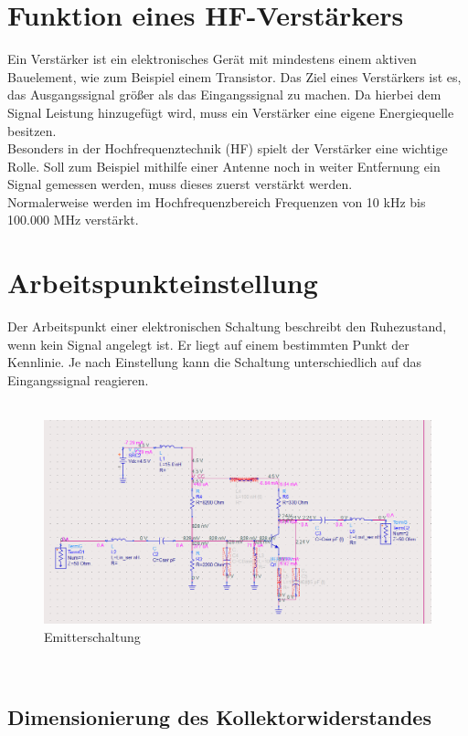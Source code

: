 

\section{Funktion eines HF-Verstärkers}
Ein Verstärker ist ein elektronisches Gerät mit mindestens einem 
aktiven Bauelement, wie zum Beispiel einem Transistor.
Das Ziel eines Verstärkers ist es, das Ausgangssignal 
größer als das Eingangssignal zu machen. Da hierbei dem Signal Leistung hinzugefügt
wird, muss ein Verstärker eine eigene Energiequelle besitzen.
\\
Besonders in der Hochfrequenztechnik (HF) spielt der Verstärker eine wichtige
Rolle. Soll zum Beispiel mithilfe einer Antenne noch in weiter Entfernung ein Signal
gemessen werden, muss dieses zuerst verstärkt werden.
\\
Normalerweise werden im Hochfrequenzbereich Frequenzen von 10 kHz bis 100.000 MHz
verstärkt.
\clearpage
\section{Arbeitspunkteinstellung}
Der Arbeitspunkt einer elektronischen Schaltung beschreibt den 
Ruhezustand, wenn kein Signal angelegt ist.
Er liegt auf einem bestimmten Punkt der Kennlinie.
Je nach Einstellung kann die Schaltung unterschiedlich auf das Eingangssignal
reagieren.
\\
\\
\begin{figure}[h]
    \centering
    \includegraphics[width=1.0\textwidth]{Pictures/Schaltplan.png}
    \caption{Emitterschaltung}
\end{figure}
\\
\subsection{Dimensionierung des Kollektorwiderstandes}

